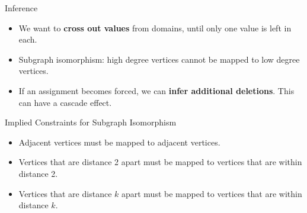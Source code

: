 \documentclass{beamer}
\begin{document}
\begin{frame}{Inference}
    \begin{itemize}
        \item We want to \textbf{cross out values} from domains, until only one value is left in
            each.
        \item Subgraph isomorphism: high degree vertices cannot be mapped to low degree vertices.
        \item If an assignment becomes forced, we can \textbf{infer additional deletions}. This can
            have a cascade effect.
    \end{itemize}
\end{frame}

\begin{frame}{Implied Constraints for Subgraph Isomorphism}
     {
        \begin{itemize}
            \item Adjacent vertices must be mapped to adjacent vertices.
            \item Vertices that are distance 2 apart must be mapped to vertices that are within
                distance 2.
            \item Vertices that are distance $k$ apart must be mapped to vertices that are within
                distance $k$.
        \end{itemize}

        \vspace{1em}

        \centering
        }
\end{frame}
\end{document}
